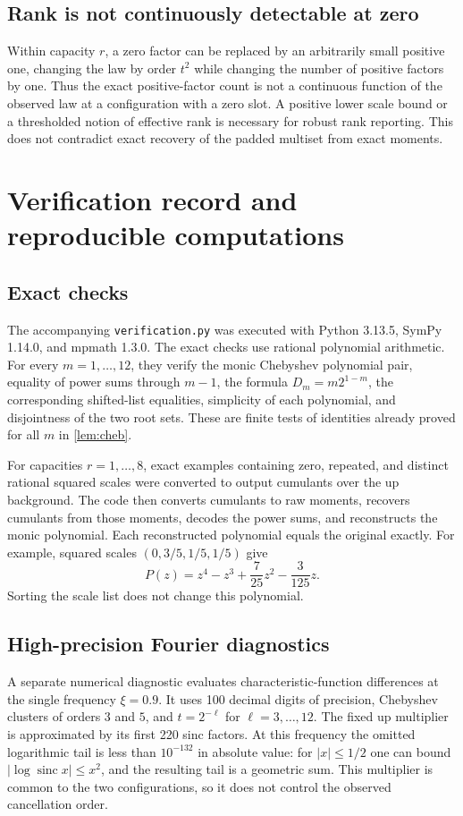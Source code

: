 \documentclass[11pt,a4paper]{article}
\numberwithin{equation}{section}
\theoremstyle{definition}
\theoremstyle{remark}
\newcommand{\sinc}{\operatorname{sinc}}
\begin{document}
\subsection{Rank is not continuously detectable at zero}
Within capacity $r$, a zero factor can be replaced by an arbitrarily small
positive one, changing the law by order $t^2$ while changing the number of
positive factors by one.  Thus the exact positive-factor count is not a
continuous function of the observed law at a configuration with a zero slot.
A positive lower scale bound or a thresholded notion of effective rank is
necessary for robust rank reporting.  This does not contradict exact recovery
of the padded multiset from exact moments.

\section{Verification record and reproducible computations}
\label{sec:verification}

\subsection{Exact checks}
The accompanying \texttt{verification.py} was executed with Python 3.13.5,
SymPy 1.14.0, and mpmath 1.3.0.  The exact checks use rational polynomial
arithmetic.  For every $m=1,\ldots,12$, they verify the monic Chebyshev polynomial
pair, equality of power sums through $m-1$, the formula $D_m=m2^{1-m}$,
the corresponding shifted-list equalities, simplicity of each polynomial,
and disjointness of the two root sets.  These are finite tests of identities
already proved for all $m$ in \cref{lem:cheb}.

For capacities $r=1,\ldots,8$, exact examples containing zero, repeated, and
distinct rational squared scales were converted to output cumulants over the
up background.  The code then converts cumulants to raw moments, recovers
cumulants from those moments, decodes the power sums, and reconstructs the
monic polynomial.  Each reconstructed polynomial equals the original exactly.
For example, squared scales $(0,3/5,1/5,1/5)$ give
\begin{equation}
 P(z)=z^4-z^3+\frac7{25}z^2-\frac3{125}z.
 \label{eq:checked-poly}
\end{equation}
Sorting the scale list does not change this polynomial.

\subsection{High-precision Fourier diagnostics}
A separate numerical diagnostic evaluates characteristic-function differences
at the single frequency $\xi=0.9$.  It uses 100 decimal digits of precision,
Chebyshev clusters of orders $3$ and $5$, and $t=2^{-\ell}$ for
$\ell=3,\ldots,12$.  The fixed up multiplier is approximated by its first 220
sinc factors.  At this frequency the omitted logarithmic tail is less than
$10^{-132}$ in absolute value: for $|x|\le1/2$ one can bound
$|\log\sinc x|\le x^2$, and the resulting tail is a geometric sum.
This multiplier is common to the two configurations, so it does not control
the observed cancellation order.
\end{document}
